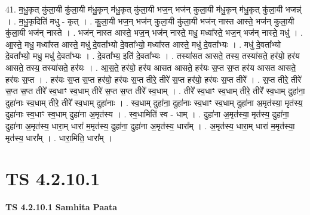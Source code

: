 \documentclass[17pt]{extarticle}
\begin{document}
41. म॒धु॒कृत् कु॑ला॒यी कु॑ला॒यी म॑धु॒कृन् म॑धु॒कृत् कु॑ला॒यी भज॒न् भज॑न् कुला॒यी म॑धु॒कृन् म॑धु॒कृत् कु॑ला॒यी भजन्न्॑ । . म॒धु॒कृदिति॑ मधु - कृत् । . कु॒ला॒यी भज॒न् भज॑न् कुला॒यी कु॑ला॒यी भज॑न् नास्त आस्ते॒ भज॑न् कुला॒यी कु॑ला॒यी भज॑न् नास्ते । . भज॑न् नास्त आस्ते॒ भज॒न् भज॑न् नास्ते॒ मधु॒ मध्वा᳚स्ते॒ भज॒न् भज॑न् नास्ते॒ मधु॑ । . आ॒स्ते॒ मधु॒ मध्वा᳚स्त आस्ते॒ मधु॑ दे॒वता᳚भ्यो दे॒वता᳚भ्यो॒ मध्वा᳚स्त आस्ते॒ मधु॑ दे॒वता᳚भ्यः । . मधु॑ दे॒वता᳚भ्यो दे॒वता᳚भ्यो॒ मधु॒ मधु॑ दे॒वता᳚भ्यः । . दे॒वता᳚भ्य॒ इति॑ दे॒वता᳚भ्यः । . तस्या॑सत आसते॒ तस्य॒ तस्या॑सते॒ हर॑यो॒ हर॑य आसते॒ तस्य॒ तस्या॑सते॒ हर॑यः । . आ॒स॒ते॒ हर॑यो॒ हर॑य आसत आसते॒ हर॑यः स॒प्त स॒प्त हर॑य आसत आसते॒ हर॑यः स॒प्त । . हर॑यः स॒प्त स॒प्त हर॑यो॒ हर॑यः स॒प्त तीरे॒ तीरे॑ स॒प्त हर॑यो॒ हर॑यः स॒प्त तीरे᳚ । . स॒प्त तीरे॒ तीरे॑ स॒प्त स॒प्त तीरे᳚ स्व॒धाꣳ स्व॒धाम् तीरे॑ स॒प्त स॒प्त तीरे᳚ स्व॒धाम् । . तीरे᳚ स्व॒धाꣳ स्व॒धाम् तीरे॒ तीरे᳚ स्व॒धाम् दुहा॑ना॒ दुहा॑नाः स्व॒धाम् तीरे॒ तीरे᳚ स्व॒धाम् दुहा॑नाः । . स्व॒धाम् दुहा॑ना॒ दुहा॑नाः स्व॒धाꣳ स्व॒धाम् दुहा॑ना अ॒मृत॑स्या॒ मृत॑स्य॒ दुहा॑नाः स्व॒धाꣳ स्व॒धाम् दुहा॑ना अ॒मृत॑स्य । . स्व॒धामिति॑ स्व - धाम् । . दुहा॑ना अ॒मृत॑स्या॒ मृत॑स्य॒ दुहा॑ना॒ दुहा॑ना अ॒मृत॑स्य॒ धारा॒म् धारा॑ म॒मृत॑स्य॒ दुहा॑ना॒ दुहा॑ना अ॒मृत॑स्य॒ धारा᳚म् । . अ॒मृत॑स्य॒ धारा॒म् धारा॑ म॒मृत॑स्या॒ मृत॑स्य॒ धारा᳚म् । . धारा॒मिति॒ धारा᳚म् । \newline
\pagebreak
{}

\section{ TS 4.2.10.1 }

\textbf{TS 4.2.10.1 } \newline
\textbf{Samhita Paata} \newline
\end{document}
